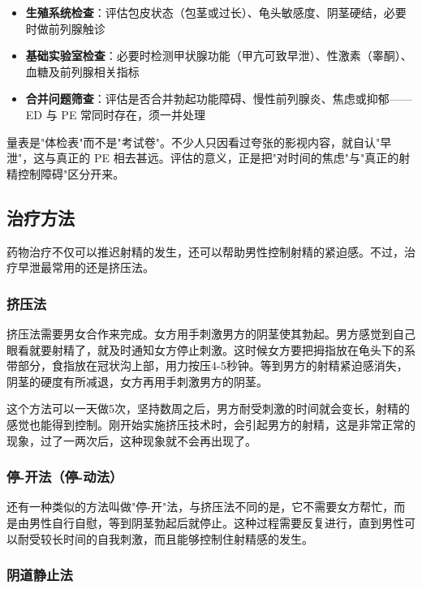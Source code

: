 \begin{itemize}
	\item \textbf{生殖系统检查}：评估包皮状态（包茎或过长）、龟头敏感度、阴茎硬结，必要时做前列腺触诊
	\item \textbf{基础实验室检查}：必要时检测甲状腺功能（甲亢可致早泄）、性激素（睾酮）、血糖及前列腺相关指标
	\item \textbf{合并问题筛查}：评估是否合并勃起功能障碍、慢性前列腺炎、焦虑或抑郁——ED 与 PE 常同时存在，须一并处理
\end{itemize}

\begin{tcolorbox}[colback=pink!5!white,colframe=red!50!black,title=贴心小叮咛]
量表是"体检表"而不是"考试卷"。不少人只因看过夸张的影视内容，就自认"早泄"，这与真正的 PE 相去甚远。评估的意义，正是把"对时间的焦虑"与"真正的射精控制障碍"区分开来。
\end{tcolorbox}

\subsection{治疗方法}

药物治疗不仅可以推迟射精的发生，还可以帮助男性控制射精的紧迫感。不过，治疗早泄最常用的还是挤压法。

\subsubsection{挤压法}

挤压法需要男女合作来完成。女方用手刺激男方的阴茎使其勃起。男方感觉到自己眼看就要射精了，就及时通知女方停止刺激。这时候女方要把拇指放在龟头下的系带部分，食指放在冠状沟上部，用力按压4-5秒钟。等到男方的射精紧迫感消失，阴茎的硬度有所减退，女方再用手刺激男方的阴茎。

这个方法可以一天做5次，坚持数周之后，男方耐受刺激的时间就会变长，射精的感觉也能得到控制。刚开始实施挤压技术时，会引起男方的射精，这是非常正常的现象，过了一两次后，这种现象就不会再出现了。

\subsubsection{停-开法（停-动法）}

还有一种类似的方法叫做"停-开"法，与挤压法不同的是，它不需要女方帮忙，而是由男性自行自慰，等到阴茎勃起后就停止。这种过程需要反复进行，直到男性可以耐受较长时间的自我刺激，而且能够控制住射精感的发生。

\subsubsection{阴道静止法}

